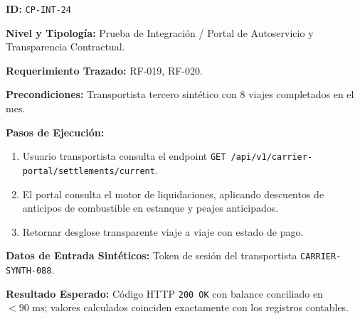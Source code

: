 \par\noindent\textbf{ID:} \texttt{C\allowbreak{}P\allowbreak{}-\allowbreak{}I\allowbreak{}N\allowbreak{}T\allowbreak{}-\allowbreak{}2\allowbreak{}4\allowbreak{}}\par
\par\noindent\textbf{Nivel y Tipología:} Prueba de Integración / Portal de Autoservicio y Transparencia Contractual.\par
\par\noindent\textbf{Requerimiento Trazado:} RF-019, RF-020.\par
\par\noindent\textbf{Precondiciones:} Transportista tercero sintético con 8 viajes completados en el mes.\par
\par\noindent\textbf{Pasos de Ejecución:} \par
\begin{enumerate}
\item Usuario transportista consulta el endpoint \texttt{G\allowbreak{}E\allowbreak{}T\allowbreak{} /\allowbreak{}a\allowbreak{}p\allowbreak{}i\allowbreak{}/\allowbreak{}v\allowbreak{}1\allowbreak{}/\allowbreak{}c\allowbreak{}a\allowbreak{}r\allowbreak{}r\allowbreak{}i\allowbreak{}e\allowbreak{}r\allowbreak{}-\allowbreak{}p\allowbreak{}o\allowbreak{}r\allowbreak{}t\allowbreak{}a\allowbreak{}l\allowbreak{}/\allowbreak{}s\allowbreak{}e\allowbreak{}t\allowbreak{}t\allowbreak{}l\allowbreak{}e\allowbreak{}m\allowbreak{}e\allowbreak{}n\allowbreak{}t\allowbreak{}s\allowbreak{}/\allowbreak{}c\allowbreak{}u\allowbreak{}r\allowbreak{}r\allowbreak{}e\allowbreak{}n\allowbreak{}t\allowbreak{}}.
\item El portal consulta el motor de liquidaciones, aplicando descuentos de anticipos de combustible en estanque y peajes anticipados.
\item Retornar desglose transparente viaje a viaje con estado de pago.
\end{enumerate}
\par\noindent\textbf{Datos de Entrada Sintéticos:} Token de sesión del transportista \texttt{C\allowbreak{}A\allowbreak{}R\allowbreak{}R\allowbreak{}I\allowbreak{}E\allowbreak{}R\allowbreak{}-\allowbreak{}S\allowbreak{}Y\allowbreak{}N\allowbreak{}T\allowbreak{}H\allowbreak{}-\allowbreak{}0\allowbreak{}8\allowbreak{}8\allowbreak{}}.\par
\par\noindent\textbf{Resultado Esperado:} Código HTTP \texttt{2\allowbreak{}0\allowbreak{}0\allowbreak{} O\allowbreak{}K\allowbreak{}} con balance conciliado en \(< 90\text{ ms}\); valores calculados coinciden exactamente con los registros contables.\par
